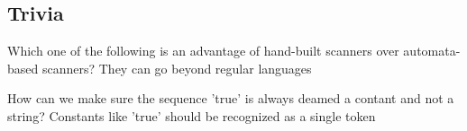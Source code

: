 \subsection{Trivia}
Which one of the following is an advantage of hand-built scanners over automata-based
scanners?
They can go beyond regular languages

How can we make sure the sequence 'true' is always deamed a contant and not a string?
Constants like 'true' should be recognized as a single token